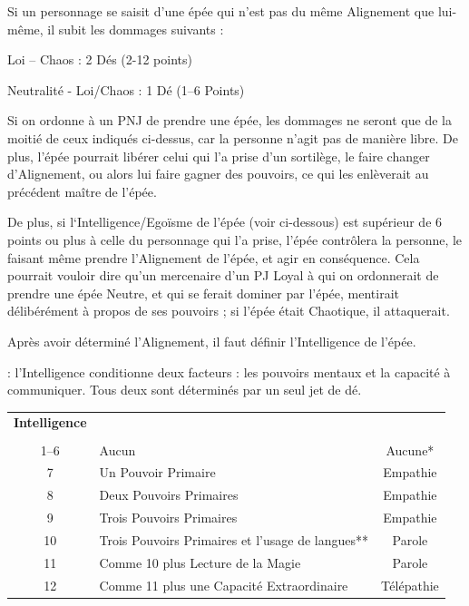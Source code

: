 \documentclass[11pt]{article}
\newcommand{\myunderline}[1]{\underline{\smash{#1}}}
\begin{document}
{{\medskip

Si un personnage se saisit d'une épée qui n'est pas du même Alignement que lui-même, il subit les dommages suivants :

\medskip

{\parindent2cm Loi -- Chaos : 2 Dés (2-12 points)

Neutralité - Loi/Chaos : 1 Dé (1--6 Points)}

\medskip

Si on ordonne à un PNJ de prendre une épée, les dommages ne seront que de la moitié de ceux indiqués ci-dessus, car la personne n'agit pas de manière libre. De plus, l'épée pourrait libérer celui qui l'a prise d'un sortilège, le faire changer d'Alignement, ou alors lui faire gagner des pouvoirs, ce qui les enlèverait au précédent maître de l'épée.

\medskip

De plus, si l‘Intelligence/Egoïsme de l'épée (voir ci-dessous) est supérieur de 6 points ou plus à celle du personnage qui l'a prise, l'épée contrôlera la personne, le faisant même prendre l'Alignement de l'épée, et agir en conséquence. Cela pourrait vouloir dire qu'un mercenaire d'un PJ Loyal à qui on ordonnerait de prendre une épée Neutre, et qui se ferait dominer par l'épée, mentirait délibérément à propos de ses pouvoirs ; si l'épée était Chaotique, il attaquerait.

\medskip

Après avoir déterminé l'Alignement, il faut définir l'Intelligence de l'épée.

\medskip

\myunderline{Intelligence} : l'Intelligence conditionne deux facteurs : les pouvoirs mentaux et la capacité à communiquer. Tous deux sont déterminés par un seul jet de dé.

\medskip

\begin{tabular}{c l c}
\textbf{Intelligence} & &\myunderline{\textbf{Capacité de}} \\
\textbf{\myunderline{(Jet de dé)}} & \myunderline{\textbf{Pouvoirs mentaux}} & \myunderline{\textbf{communication}} \\
1--6 & Aucun & Aucune* \\
7 & Un Pouvoir Primaire & Empathie \\
8 & Deux Pouvoirs Primaires & Empathie \\
9 & Trois Pouvoirs Primaires & Empathie \\
10 & Trois Pouvoirs Primaires et l'usage de langues** & Parole \\
11 & Comme 10 plus Lecture de la Magie & Parole \\
12 & Comme 11 plus une Capacité Extraordinaire & Télépathie \\
\end{tabular}

}}
\end{document}
